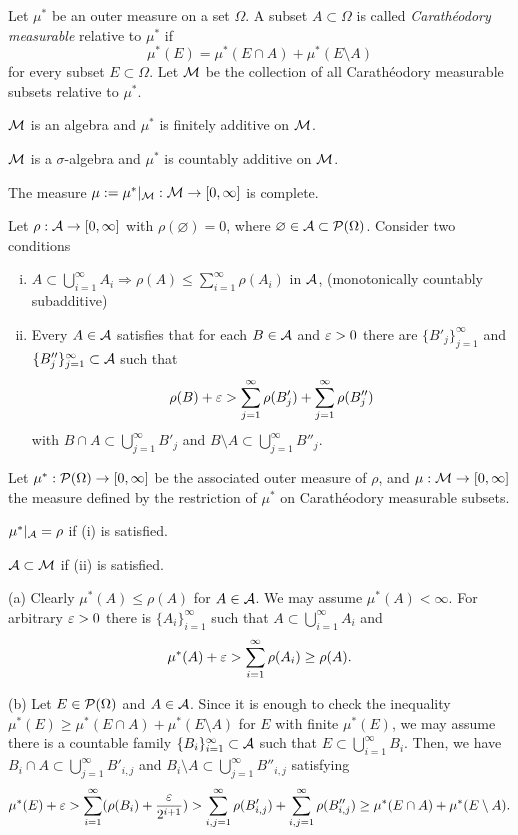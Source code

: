\documentclass{../note}
\begin{document}
\begin{prb}
Let $\mu^*$ be an outer measure on a set $\Omega$.
A subset $A\subset \Omega$ is called \emph{Carath\'eodory measurable} relative to $\mu^*$ if
\[\mu^*(E)=\mu^*(E\cap A)+\mu^*(E\setminus A)\]
for every subset $E\subset\Omega$.
Let $\mathcal{M}$ be the collection of all Carath\'eodory measurable subsets relative to $\mu^*$.
\begin{parts}
\item $\mathcal{M}$ is an algebra and $\mu^*$ is finitely additive on $\mathcal{M}$.
\item $\mathcal{M}$ is a $\sigma$-algebra and $\mu^*$ is countably additive on $\mathcal{M}$.
\item The measure $\mu:=\mu^*|_{\mathcal{M}}:\mathcal{M}\to[0,\infty]$ is complete.
\end{parts}
\end{prb}


\begin{prb}
Let $\rho:\mathcal{A}\to[0,\infty]$ with $\rho(\varnothing)=0$, where $\varnothing\in\mathcal{A}\subset\mathcal{P}(\Omega)$.
Consider two conditions
\begin{enumerate}[(i)]
\item $A\subset\bigcup_{i=1}^\infty A_i\Rightarrow\rho(A)\le\sum_{i=1}^\infty\rho(A_i)$ in $\mathcal{A}$,
\hfill{(monotonically countably subadditive)}
\item Every $A\in\mathcal{A}$ satisfies that for each $B\in\mathcal{A}$ and $\varepsilon>0$ there are $\{B'_j\}_{j=1}^\infty$ and $\{B''_j\}_{j=1}^\infty\subset\mathcal{A}$ such that
\[\rho(B)+\varepsilon>\sum_{j=1}^\infty\rho(B'_j)+\sum_{j=1}^\infty\rho(B''_j)\]
with $B\cap A\subset\bigcup_{j=1}^\infty B'_j$ and $B\setminus A\subset\bigcup_{j=1}^\infty B''_j$.
\end{enumerate}
Let $\mu^*:\mathcal{P}(\Omega)\to[0,\infty]$ be the associated outer measure of $\rho$, and $\mu:\mathcal{M}\to[0,\infty]$ the measure defined by the restriction of $\mu^*$ on Carath\'eodory measurable subsets.
\begin{parts}
\item $\mu^*|_{\mathcal{A}}=\rho$ if (i) is satisfied.
\item $\mathcal{A}\subset\mathcal{M}$ if (ii) is satisfied.
\end{parts}
\end{prb}
\begin{pf}
(a)
Clearly $\mu^*(A)\le\rho(A)$ for $A\in\mathcal{A}$.
We may assume $\mu^*(A)<\infty$.
For arbitrary $\varepsilon>0$ there is $\{A_i\}_{i=1}^\infty$ such that $A\subset\bigcup_{i=1}^\infty A_i$ and
\[\mu^*(A)+\varepsilon>\sum_{i=1}^\infty\rho(A_i)\ge\rho(A).\]

(b)
Let $E\in\mathcal{P}(\Omega)$ and $A\in\mathcal{A}$.
Since it is enough to check the inequality $\mu^*(E)\ge\mu^*(E\cap A)+\mu^*(E\setminus A)$ for $E$ with finite $\mu^*(E)$, we may assume there is a countable family $\{B_i\}_{i=1}^\infty\subset\mathcal{A}$ such that $E\subset\bigcup_{i=1}^\infty B_i$.
Then, we have $B_i\cap A\subset\bigcup_{j=1}^\infty B'_{i,j}$ and $B_i\setminus A\subset\bigcup_{j=1}^\infty B''_{i,j}$ satisfying
\[\mu^*(E)+\varepsilon>\sum_{i=1}^\infty(\rho(B_i)+\frac{\varepsilon}{2^{i+1}})
>\sum_{i,j=1}^\infty\rho(B'_{i,j})+\sum_{i,j=1}^\infty\rho(B''_{i,j})\ge\mu^*(E\cap A)+\mu^*(E\setminus A).\]
\end{pf}
\end{document}
